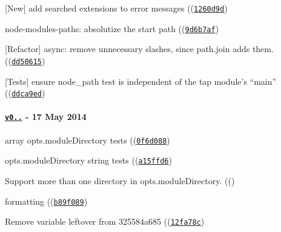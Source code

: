 \begin{DoxyItemize}
\item \mbox{[}New\mbox{]} add searched extensions to error messages ((\href{https://github.com/browserify/resolve/commit/1260d9d1e2f55efb514540db9aa1b3d679f9db10}{\tt {\ttfamily 1260d9d}})
\item node-\/modules-\/paths\+: absolutize the {\ttfamily start} path ((\href{https://github.com/browserify/resolve/commit/9d6b7af28c054676d6ea8a5037353ed750ea13bb}{\tt {\ttfamily 9d6b7af}})
\item \mbox{[}Refactor\mbox{]} {\ttfamily async}\+: remove unnecessary slashes, since {\ttfamily path.\+join} adds them. ((\href{https://github.com/browserify/resolve/commit/dd506158089f7d071d2a9f61cd4385365d177219}{\tt {\ttfamily dd50615}})
\item \mbox{[}Tests\mbox{]} ensure node\+\_\+path test is independent of the {\ttfamily tap} module’s “main” ((\href{https://github.com/browserify/resolve/commit/ddca9ed7e1d980d5ec561450875cb09463effd5a}{\tt {\ttfamily ddca9ed}})
\end{DoxyItemize}

\paragraph*{\href{https://github.com/browserify/resolve/compare/v0.6.3...v0.7.0}{\tt v0..} -\/ 17 May 2014}


\begin{DoxyItemize}
\item array opts.\+module\+Directory tests ((\href{https://github.com/browserify/resolve/commit/0f6d08801db6bc2044df8767226421172a2d9461}{\tt {\ttfamily 0f6d088}})
\item opts.\+module\+Directory string tests ((\href{https://github.com/browserify/resolve/commit/a15ffd6c20772831c41146189c117ab0a0650e0b}{\tt {\ttfamily a15ffd6}})
\item Support more than one directory in opts.\+module\+Directory. ((\href{https://github.com/browserify/resolve/commit/41834633e84d76d86297968ba34c375f26fe4f08}{\tt {}})
\item formatting ((\href{https://github.com/browserify/resolve/commit/b89f08902e8551e07d66e81a3dc33840e24266c5}{\tt {\ttfamily b89f089}})
\item Remove variable leftover from 325584a685 ((\href{https://github.com/browserify/resolve/commit/12fa78ce43c4363e1c9600b635d18cd295c6949f}{\tt {\ttfamily 12fa78c}})
\end{DoxyItemize}


